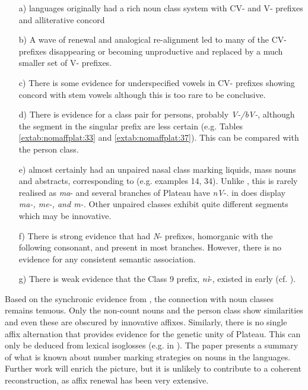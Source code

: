 \documentclass[output=paper]{langsci/langscibook}
\begin{document}
\largerpage
\begin{enumerate}
\item[a)]  languages originally had a rich noun class system with CV- and V- prefixes and alliterative concord
\item[b)] A wave of renewal and analogical re-alignment led to many of the CV- prefixes disappearing or becoming unproductive and replaced by a much smaller set of V- prefixes.
\item[c)] There is some evidence for underspecified vowels in CV- prefixes showing concord with stem vowels although this is too rare to be conclusive.
\item[d)] There is evidence for a class pair for persons, probably \textit{V-/bV-}, although the segment in the singular prefix are less certain (e.g. Tables \ref{extab:nomaffplat:33} and \ref{extab:nomaffplat:37}). This can be compared with the  person class.
\item[e)]  almost certainly had an unpaired nasal class marking liquids, mass nouns and abstracts, corresponding to  (e.g. examples 14, 34). Unlike , this is rarely realised as \textit{ma}- and several branches of Plateau have \textit{nV}-.  in   does display \textit{ma-, me-, and m-.} Other unpaired classes exhibit quite different segments which may be innovative. 
\item[f)] There is strong evidence that  had \textit{N}- prefixes, homorganic with the following consonant, and present in most branches. However, there is no evidence for any consistent semantic association.
\item[g)] There is weak evidence that the  Class 9 prefix, \textit{nì}-, existed in early  (cf. ).
\end{enumerate}

Based on the synchronic evidence from , the connection with  noun classes remains tenuous. Only the non-count nouns and the person class show similarities and even these are obscured by innovative affixes. Similarly, there is no single affix alternation that provides evidence for the genetic unity of Plateau. This can only be deduced from lexical isoglosses
(e.g. in \citealt{Blench2000wocal}).
The paper presents a summary of what is known about number marking strategies on nouns in the  languages. Further work will enrich the picture, but it is unlikely to contribute to a coherent reconstruction, as affix renewal has been very extensive. 
 
\end{document}

